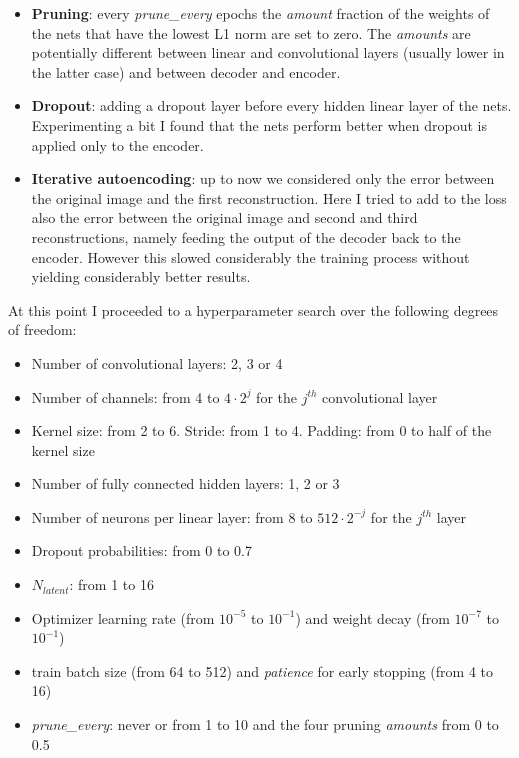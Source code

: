 \documentclass[a4paper, 11pt]{article}
\begin{document}
    \begin{itemize}
      \item \textbf{Pruning}: every \emph{prune\_every} epochs the \emph{amount} fraction of the weights of the nets that have the lowest L1 norm are set to zero. The \emph{amounts} are potentially different between linear and convolutional layers (usually lower in the latter case) and between decoder and encoder.
      \item \textbf{Dropout}: adding a dropout layer before every hidden linear layer of the nets. Experimenting a bit I found that the nets perform better when dropout is applied only to the encoder.
      \item \textbf{Iterative autoencoding}: up to now we considered only the error between the original image and the first reconstruction. Here I tried to add to the loss also the error between the original image and second and third reconstructions, namely feeding the output of the decoder back to the encoder. However this slowed considerably the training process without yielding considerably better results.
    \end{itemize}

    At this point I proceeded to a hyperparameter search over the following degrees of freedom:
    \begin{itemize}
      \item Number of convolutional layers: 2, 3 or 4
      \item Number of channels: from 4 to $4\cdot2^j$ for the $j^{th}$ convolutional layer
      \item Kernel size: from 2 to 6. Stride: from 1 to 4. Padding: from 0 to half of the kernel size
      \item Number of fully connected hidden layers: 1, 2 or 3
      \item Number of neurons per linear layer: from 8 to $512\cdot2^{-j}$ for the $j^{th}$ layer
      \item Dropout probabilities: from 0 to 0.7
      \item $N_{latent}$: from 1 to 16
      \item Optimizer learning rate (from $10^{-5}$ to $10^{-1}$) and weight decay (from $10^{-7}$ to $10^{-1}$)
      \item train batch size (from 64 to 512) and \emph{patience} for early stopping (from 4 to 16)
      \item \emph{prune\_every}: never or from 1 to 10 and the four pruning \emph{amounts} from 0 to 0.5
    \end{itemize}
\end{document}
